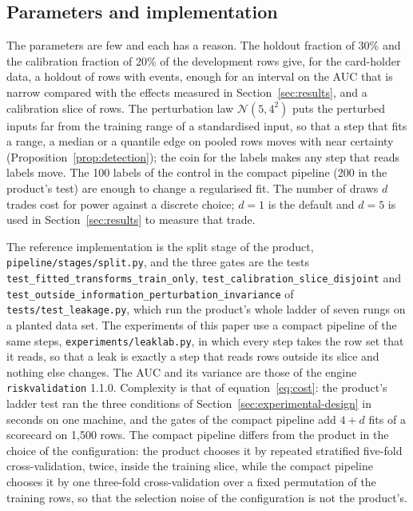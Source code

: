 \subsection{Parameters and implementation}

The parameters are few and each has a reason. The holdout fraction of 30\% and the calibration fraction of 20\% of the development rows give, for the card-holder data, a holdout of  rows with  events, enough for an interval on the AUC that is narrow compared with the effects measured in Section~\ref{sec:results}, and a calibration slice of  rows. The perturbation law $\mathcal N(5,4^2)$ puts the perturbed inputs far from the training range of a standardised input, so that a step that fits a range, a median or a quantile edge on pooled rows moves with near certainty (Proposition~\ref{prop:detection}); the coin for the labels makes any step that reads labels move. The 100 labels of the control in the compact pipeline (200 in the product's test) are enough to change a regularised fit. The number of draws $d$ trades cost for power against a discrete choice; $d=1$ is the default and $d=5$ is used in Section~\ref{sec:results} to measure that trade.

The reference implementation is the split stage of the product, \texttt{pipeline/\allowbreak{}stages/\allowbreak{}split.py}, and the three gates are the tests \texttt{test\_\allowbreak{}fitted\_\allowbreak{}transforms\_\allowbreak{}train\_\allowbreak{}only}, \texttt{test\_\allowbreak{}calibration\_\allowbreak{}slice\_\allowbreak{}disjoint} and \texttt{test\_\allowbreak{}outside\_\allowbreak{}information\_\allowbreak{}perturbation\_\allowbreak{}invariance} of \texttt{tests/\allowbreak{}test\_\allowbreak{}leakage.py}, which run the product's whole ladder of seven rungs on a planted data set. The experiments of this paper use a compact pipeline of the same steps, \texttt{experiments/\allowbreak{}leaklab.py}, in which every step takes the row set that it reads, so that a leak is exactly a step that reads rows outside its slice and nothing else changes. The AUC and its variance are those of the engine \texttt{riskvalidation} 1.1.0. Complexity is that of equation~\eqref{eq:cost}: the product's ladder test ran the three conditions of Section~\ref{sec:experimental-design} in  seconds on one machine, and the gates of the compact pipeline add $4+d$ fits of a scorecard on 1,500 rows. The compact pipeline differs from the product in the choice of the configuration: the product chooses it by repeated stratified five-fold cross-validation, twice, inside the training slice, while the compact pipeline chooses it by one three-fold cross-validation over a fixed permutation of the training rows, so that the selection noise of the configuration is not the product's.

